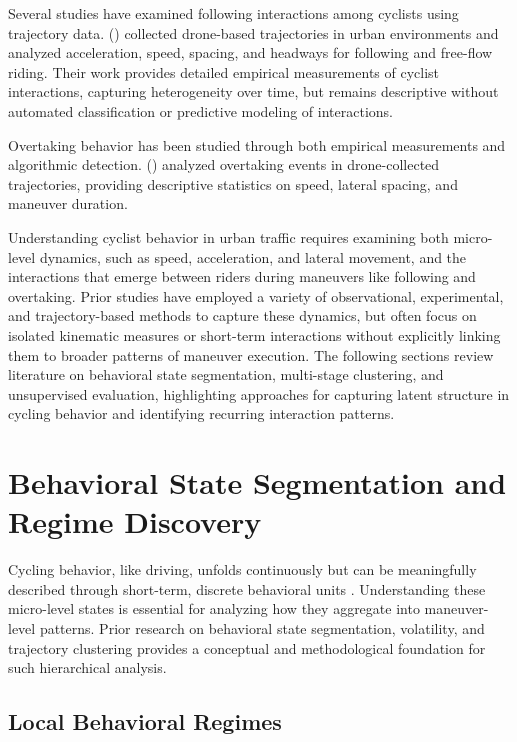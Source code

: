 Several studies have examined following interactions among cyclists using trajectory data. \citeauthor{kutsch_analyzing_2025} (\citeyear{kutsch_analyzing_2025}) collected drone-based trajectories in urban environments and analyzed acceleration, speed, spacing, and headways for following and free-flow riding. Their work provides detailed empirical measurements of cyclist interactions, capturing heterogeneity over time, but remains descriptive without automated classification or predictive modeling of interactions. 


Overtaking behavior has been studied through both empirical measurements and algorithmic detection. \citeauthor{kutsch_analyzing_2025} (\citeyear{kutsch_analyzing_2025}) analyzed overtaking events in drone-collected trajectories, providing descriptive statistics on speed, lateral spacing, and maneuver duration. 

\fi


Understanding cyclist behavior in urban traffic requires examining both micro-level dynamics, such as speed, acceleration, and lateral movement, and the interactions that emerge between riders during maneuvers like following and overtaking. Prior studies have employed a variety of observational, experimental, and trajectory-based methods to capture these dynamics, but often focus on isolated kinematic measures or short-term interactions without explicitly linking them to broader patterns of maneuver execution. The following sections review literature on behavioral state segmentation, multi-stage clustering, and unsupervised evaluation, highlighting approaches for capturing latent structure in cycling behavior and identifying recurring interaction patterns.

\section{Behavioral State Segmentation and Regime Discovery}
\label{rel:regimes}
Cycling behavior, like driving, unfolds continuously but can be meaningfully described through short-term, discrete behavioral units \cite{pentland_modeling_1999}. Understanding these micro-level states is essential for analyzing how they aggregate into maneuver-level patterns. Prior research on behavioral state segmentation, volatility, and trajectory clustering provides a conceptual and methodological foundation for such hierarchical analysis.

\subsection*{Local Behavioral Regimes}

